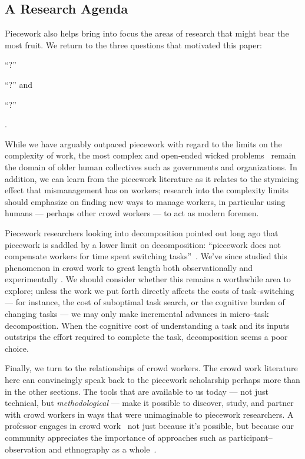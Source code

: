 \documentclass[trackingWork]{subfiles}
\begin{document}
\subsection{A Research Agenda}\label{sec:whatShouldBeTheFuture}
Piecework also helps bring into focus the
areas of research that might bear the most fruit.
We return to the three questions that motivated this paper:
\begin{inlinelist}
  \item ``?''
  \item ``?''
        and
  \item ``?''
\end{inlinelist}.

While we have arguably outpaced piecework with regard to the limits on the complexity of work,
the most complex and open-ended wicked problems~\cite{rittel1973dilemmas} remain the domain of older human collectives such as governments and organizations. 
In addition, we can learn from the piecework literature as it relates to
the stymieing effect that mismanagement has on workers;
research into the complexity limits should emphasize on finding new ways to manage workers,
in particular using humans --- perhaps other crowd workers ---
to act as modern foremen.

Piecework researchers looking into decomposition pointed out long ago that
piecework is saddled by a lower limit on decomposition:
``piecework does not compensate workers for time spent switching tasks''~\cite{bewley1999wages}.
We've since studied this phenomenon in crowd work to great length both
observationally \cite{taskSearch} and
experimentally \cite{delayAndOrderLasecki}.
We should consider whether this remains a worthwhile area to explore; %
unless the work we put forth directly affects the costs of task--switching
--- for instance, the cost of suboptimal task search, or the cognitive burden of changing tasks ---
we may only make incremental advances in micro--task decomposition.
When the cognitive cost of understanding a task and its inputs outstrips the effort required to complete the task, decomposition seems a poor choice.

Finally, we turn to the relationships of crowd workers.
The crowd work literature here can convincingly speak back to
the piecework scholarship perhaps more than in the other sections.
The tools that are available to us today
--- not just technical, but \textit{methodological} ---
make it possible to
discover,
study, and
partner with 
crowd workers in ways that were unimaginable to piecework researchers.
A professor engages in crowd work~\cite{bighamHalfWorkday}
not just because it's possible, but because our community
appreciates the importance of approaches such as participant--observation and ethnography as a whole~\cite{olson2014ways}.


\onlyinsubfile{
  \balance{}
  \printbibliography
}
\end{document}
